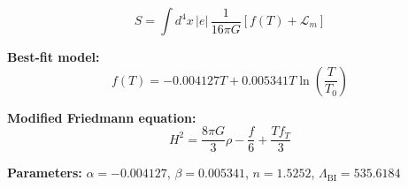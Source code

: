
\begin{equation}
  S = \int d^4x \, |e| \, \frac{1}{16\pi G} \left[ f(T) + \mathcal{L}_m \right]
\end{equation}

\textbf{Best-fit model:}
\begin{equation}
  f(T) = -0.004127 T + 0.005341 T \ln\!\left(\frac{T}{T_0}\right)
\end{equation}

\textbf{Modified Friedmann equation:}
\begin{equation}
  H^2 = \frac{8\pi G}{3} \rho - \frac{f}{6} + \frac{T f_T}{3}
\end{equation}

\textbf{Parameters:}
$\alpha = -0.004127$, \quad
$\beta = 0.005341$, \quad
$n = 1.5252$, \quad
$\Lambda_{\text{BI}} = 535.6184$